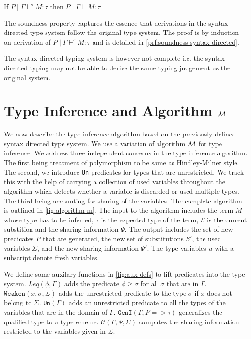 \begin{theorem}
  If $P \mid \Gamma \vdash^s M:\tau$ then $P \mid \Gamma \vdash M : \tau$
\end{theorem}
The soundness property captures the essence that derivations in the syntax directed type system follow the original type system.
The proof is by induction on derivation of $P \mid \Gamma \vdash^s M:\tau$ and is detailed in \cref{prf:soundness-syntax-directed}.

The syntax directed typing system is however not complete i.e. the syntax directed typing may not be able to derive the same
typing judgement as the original system.


\section{Type Inference and Algorithm $\mathcal{M}$}\label{sec:algorithm-m}
We now describe the type inference algorithm based on the previously defined syntax directed
type system. We use a variation of algorithm $\mathcal{M}$ \citep{lee_proofs_1998} for type inference.
We address three independent concerns in the type inference algorithm.
The first being treatment of polymorphism to be same as Hindley-Milner style. The second, we introduce
\texttt{Un} predicates for types that are unrestricted. We track this with the help of carrying a
collection of used variables throughout the algorithm which detects whether a variable is discarded
or used multiple types. The third being accounting for sharing of the variables.
The complete algorithm is outlined in \cref{fig:algorithm-m}. The input to the algorithm includes the term $M$ whose
type has to be inferred, $\tau$ is the expected type of the term, $S$ is the current substition and the
sharing information $\Psi$. The output includes the set of new predicates $P$ that are generated,
the new set of substitutions $S'$, the used variables $\Sigma$, and the new sharing information $\Psi'$.
The type variables $u$ with a subscript denote fresh variables.

We define some auxilary functions in \cref{fig:aux-defs} to lift predicates into the type system.
$Leq(\phi, \Gamma)$ adds the predicate $\phi \geq \sigma$ for all $\sigma$ that are in $\Gamma$.
$\texttt{Weaken}(x, \sigma, \Sigma)$ adds the unrestricted predicate to the type $\sigma$
if $x$ does not belong to $\Sigma$. $\texttt{Un}(\Gamma)$ adds an unrestricted
predicate to all the types of the variables that are in the domain of $\Gamma$.
$\texttt{GenI}(\Gamma, P => \tau)$ generalizes the qualified type to a type scheme.
$\mathcal{C}(\Gamma, \Psi, \Sigma)$ computes the sharing information
restricted to the variables given in $\Sigma$.

